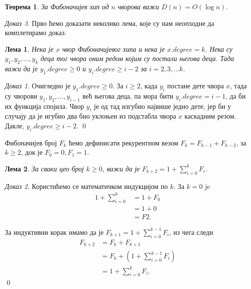 \documentclass[11pt, a4paper]{article}
\newtheorem{teorema}{\selectlanguage{russian} Теорема}[subsection]
\newtheorem{lema}{\selectlanguage{russian} Лема} [subsection]
\theoremstyle{remark}
\newtheorem*{dokaz}{\selectlanguage{russian} Доказ}
\numberwithin{equation}{section}
\begin{document}
	\begin{teorema}
		\normalfont
		За Фибоначијев хип од $n$ чворова важи $D(n)=O(\log n)$.
	\end{teorema}

	\begin{dokaz}
		\normalfont
		Прво ћемо доказати неколико лема, које су нам неопходне да комплетирамо доказ.
	
	\begin{lema}
		\normalfont
		Нека је $x$ чвор Фибоначијевог хипа и нека је $x.degree=k$. Нека су $y_1, y_2, ..., y_k$ деца тог чвора оним редом којим су постали његова деца. Тада важи да је $y_1 .degree \geq 0$ и $y_i .degree \geq i-2$ за $i=2, 3, ...k$.
	\end{lema}

	\begin{dokaz}
		Очигледно је $y_1 .degree \geq 0$. За $i \geq 2$, када $y_i$ постане дете чвора $x$, тада су чворови $y_1, y_2, ..., y_{i-1}$ већ његова деца, па мора бити $y_i .degree=i-1$, да би их функција  спојила. Чвор $y_i$ је од тад изгубио највише једно дете, јер би у случају да је игубио два био уклоњен из подстабла чвора $x$ каскадним резом. Дакле, $y_i .degree \geq i-2$. \qed \\
	\end{dokaz}

	\noindent Фибоначијев број $F_k$ ћемо дефинисати рекурентном везом $F_k=F_{k-1}+F_{k-2}$, за $k \geq 2$, док је $F_0=0, F_1=1$.
	
	\begin{lema}
		\normalfont
		За сваки цео број $k \geq 0$, важи да је $F_{k+2}=1+\sum_{i=0}^{k}F_i$.
	\end{lema}
	
	\begin{dokaz}
		Користићемо се математичком индукцијом по $k$. За $k=0$ je		
		\begin{equation}
			\begin{split}
			1+\sum_{i=0}^{0} &= 1+F_0 \\
			&= 1+0 \\
			&= F2.
			\end{split}
		\end{equation}
		
		\indent За индуктивни корак имамо да је $F_{k+1}=1+\sum_{i=0}^{k-1}F_i$, из чега следи		
		\begin{equation}
			\begin{split}
				F_{k+2} &= F_k + F_{k+1} \\
				&= F_k + \left (1+ \sum_{i=0}^{k-1}F_i \right) \\
				&= 1+\sum_{i=0}^{k}F_i.
			\end{split}
		\end{equation}
		\qed
	\end{dokaz}
	

\end{dokaz}
\end{document}
